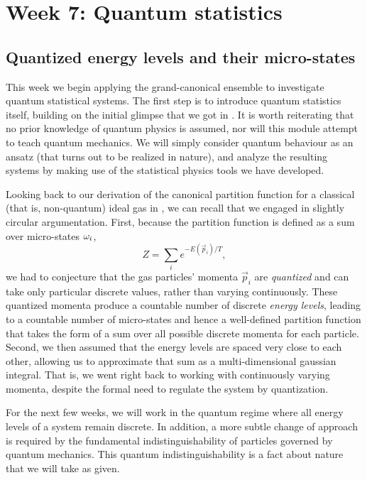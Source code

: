 \renewcommand{\thisweek}{MATH327 Week 7}
\renewcommand{\moddate}{Last modified 11 Apr.~2021}
\setcounter{section}{7}
\setcounter{subsection}{0}
{}
\section*{Week 7: Quantum statistics}
\subsection{\label{sec:quantum}Quantized energy levels and their micro-states}
This week we begin applying the grand-canonical ensemble to investigate quantum statistical systems.
The first step is to introduce quantum statistics itself, building on the initial glimpse that we got in .
It is worth reiterating that no prior knowledge of quantum physics is assumed, nor will this module attempt to teach quantum mechanics.
We will simply consider quantum behaviour as an ansatz (that turns out to be realized in nature), and analyze the resulting systems by making use of the statistical physics tools we have developed.

Looking back to our derivation of the canonical partition function for a classical (that is, non-quantum) ideal gas in , we can recall that we engaged in slightly circular argumentation.
First, because the partition function is defined as a sum over micro-states $\omega_i$,
\begin{equation*}
  Z = \sum_i e^{-E(\vec{p}_i) / T},
\end{equation*}
we had to conjecture that the gas particles' momenta $\vec{p}_i$ are \textit{quantized} and can take only particular discrete values, rather than varying continuously.
These quantized momenta produce a countable number of discrete \textit{energy levels}, leading to a countable number of micro-states and hence a well-defined partition function that takes the form of a sum over all possible discrete momenta for each particle.
Second, we then assumed that the energy levels are spaced very close to each other, allowing us to approximate that sum as a multi-dimensional gaussian integral.
That is, we went right back to working with continuously varying momenta, despite the formal need to regulate the system by quantization.

For the next few weeks, we will work in the quantum regime where all energy levels of a system remain discrete.
In addition, a more subtle change of approach is required by the fundamental indistinguishability of particles governed by quantum mechanics.
This quantum indistinguishability is a fact about nature that we will take as given.

